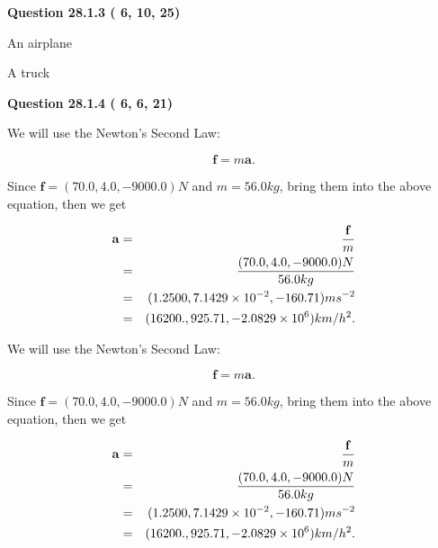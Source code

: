 \documentclass[12pt]{article}
\begin{document}
 
 
  
\vspace{0.2in}
  
{\textbf{\Large{Question
28.1.3 
 (          6,         10,         25)
}}}
  
  
 
 
\noindent{}
 
 
An airplane
 
 
A truck
 
 
 
 
  
\vspace{0.2in}
  
{\textbf{\Large{Question
28.1.4 
 (          6,          6,         21)
}}}
  
  
 
 
\noindent{}

We will use the Newton's Second Law:
 
\[
\mathbf{f}=m\mathbf{a}.
\]
 
Since $\mathbf{f}=( %
70.0,  %
4.0,  %
-9000.0 )N$
and $m= %
56.0 kg$, bring them into the above equation, then we get
 
\begin{eqnarray*}
\mathbf{a}&=&\frac{\mathbf{f}}m  \\
&=&\frac{(
70.0 ,
4.0 ,
-9000.0 )N
}{ %
56.0 kg}  \\
&=&(
1.2500 ,
7.1429 \times 10^{-2},
-160.71
)ms^{-2} \\
&=&(
16200. ,
925.71 ,
-2.0829 \times 10^{6}
)km/h^2.
\end{eqnarray*}
 
 
 
 
 
\noindent{}

We will use the Newton's Second Law:
 
\[
\mathbf{f}=m\mathbf{a}.
\]
 
Since $\mathbf{f}=( %
70.0,  %
4.0,  %
-9000.0 )N$
and $m= %
56.0 kg$, bring them into the above equation, then we get
 
\begin{eqnarray*}
\mathbf{a}&=&\frac{\mathbf{f}}m  \\
&=&\frac{(
70.0 ,
4.0 ,
-9000.0 )N
}{ %
56.0 kg}  \\
&=&(
1.2500 ,
7.1429 \times 10^{-2},
-160.71
)ms^{-2} \\
&=&(
16200. ,
925.71 ,
-2.0829 \times 10^{6}
)km/h^2.
\end{eqnarray*}
 
\end{document}
